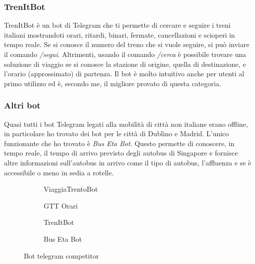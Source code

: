 \subsubsection{TrenItBot}

TrenItBot è un bot di Telegram che ti permette di cercare e seguire i treni italiani mostrandoti orari, ritardi, binari, fermate, cancellazioni e scioperi in tempo reale. Se si conosce il numero del treno che si vuole seguire, si può inviare il comando \textit{/segui}. Altrimenti, usando il comando \textit{/cerca} è possibile trovare una soluzione di viaggio se si conosce la stazione di origine, quella di destinazione, e l'orario (approssimato) di partenza. Il bot è molto intuitivo anche per utenti al primo utilizzo ed è, secondo me, il migliore provato di questa categoria.

\subsubsection{Altri bot}
Quasi tutti i bot Telegram legati alla mobilità di città non italiane erano offline, in particolare ho trovato dei bot per le città di Dublino e Madrid. L'unico funzionante che ho trovato è \textit{Bus Eta Bot}. Questo permette di conoscere, in tempo reale, il tempo di arrivo previsto degli autobus di Singapore e fornisce altre informazioni sull'autobus in arrivo come il tipo di autobus, l'affluenza e se è accessibile o meno in sedia a rotelle.

\begin{figure}[htb]
    \centering 
\begin{subfigure}{0.20\textwidth}
\caption{ViaggiaTrentoBot}
\label{fig:viaggia_trento}
\end{subfigure}\hfil
\begin{subfigure}{0.20\textwidth}
\caption{GTT Orari}
\label{fig:gtt_orari}
\end{subfigure}\hfil 
\begin{subfigure}{0.20\textwidth}
\caption{TrenItBot}
\label{fig:trenit_bot}
\end{subfigure}\hfil 
\begin{subfigure}{0.20\textwidth}
\caption{Bus Eta Bot}
\label{fig:bus_eta_bot}
\end{subfigure}
\caption{
\label{fig:bot_competitor}Bot telegram competitor}
\end{figure}

